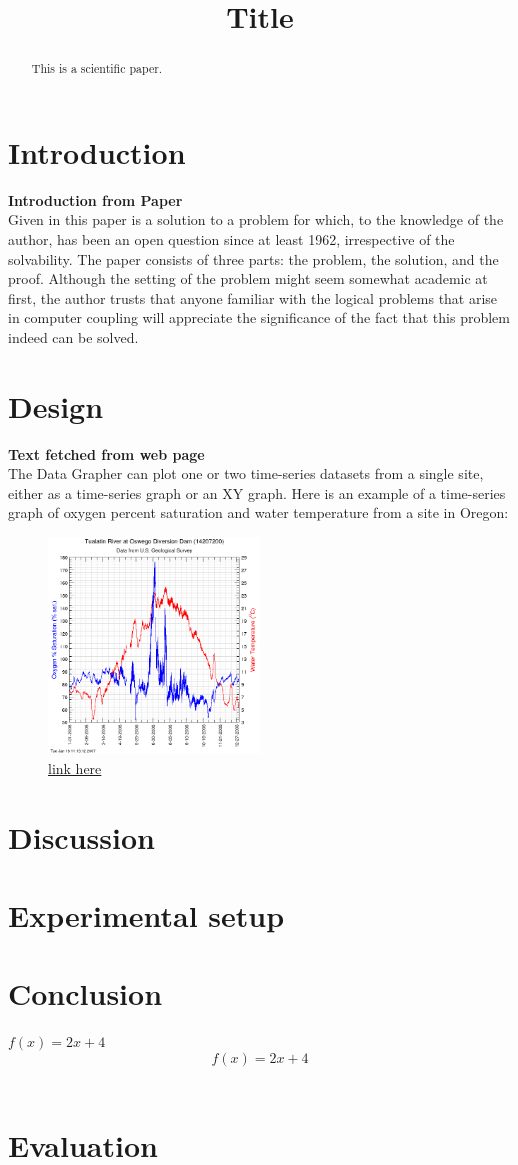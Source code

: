 \documentclass[conference]{IEEEtran}
\title{Title}
\author{\IEEEauthorblockN{Name}
\IEEEauthorblockA{
UiT The Arctic University of Norway\\
Department of Computer Science\\
Email: xxxXXX@post.uit.no}}
\begin{document}
\maketitle
\begin{abstract}
  This is a scientific paper.
\end{abstract}
\section*{Introduction}
\textbf{Introduction from \cite{Dijkstra} Paper}\\
Given in this paper is a solution to a problem for which,
to the knowledge of the author, has been an open question
since at least 1962, irrespective of the solvability. The
paper consists of three parts: the problem, the solution,
and the proof. Although the setting of the problem might
seem somewhat academic at first, the author trusts that
anyone familiar with the logical problems that arise in
computer coupling will appreciate the significance of the
fact that this problem indeed can be solved.\cite{Dijkstra}
\section*{Design}
\textbf{Text fetched from \cite{Usgvs} web page}\\
The Data Grapher can plot one or two time-series datasets from a single site, either as a time-series graph or an XY graph. Here is an example of a time-series graph of oxygen percent saturation and water temperature from a site in Oregon:\cite{Usgvs}
\begin{figure}[h]
  \includegraphics[width=0.5\textwidth]{example.png}
  \caption{\href{https://or.water.usgs.gov/grapher/tutorial/examples.html}{link here}}
\end{figure}

\section*{Discussion}

\section*{Experimental setup}

\section*{Conclusion}
 $f(x) = 2x + 4$ \\
$$f(x) = 2x + 4$$\\
\section*{Evaluation}


\printbibliography
\end{document}
